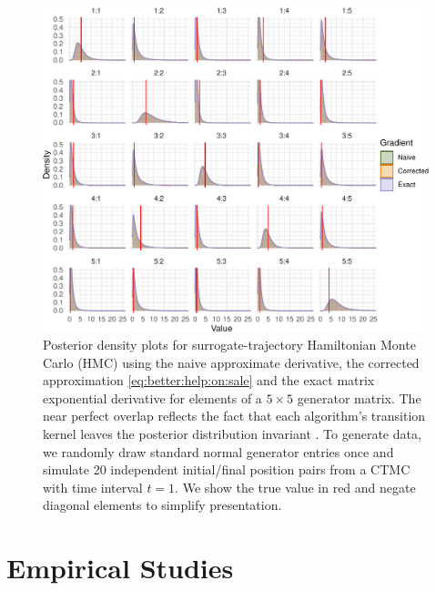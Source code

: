 \documentclass[9pt,twocolumn,twoside]{pnas-new}
\newcommand{\?}{\textbf{?}}
\begin{document}
\begin{figure}[!t]
	\centering
	\includegraphics[width=\linewidth]{lowDimVis.pdf}
	\vspace{-2em}
	\caption{Posterior density plots for surrogate-trajectory Hamiltonian Monte Carlo (HMC) using the naive approximate derivative, the corrected approximation \eqref{eq:better:help:on:sale} and the exact matrix exponential derivative for elements of a $5\times 5$ generator matrix. The near perfect overlap reflects the fact that each algorithm's transition kernel leaves the posterior distribution invariant \cite{glatt2020accept}.  To generate data, we randomly draw standard normal generator entries once and simulate 20 independent initial/final position pairs from a CTMC with time interval $t=1$.  We show the true value in red and negate diagonal elements to simplify presentation.  }\label{fig:lowDim}
\end{figure}

\section{Empirical Studies}\label{sec:emp}
\end{document}
